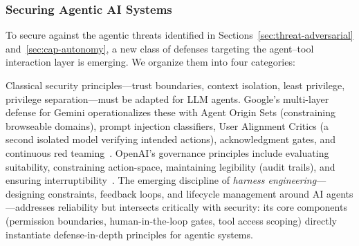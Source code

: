 \subsubsection{Securing Agentic AI Systems}
\label{sec:agentic-security}


To secure against the agentic threats identified in Sections~\ref{sec:threat-adversarial} and~\ref{sec:cap-autonomy}, a new class of defenses targeting the agent--tool interaction layer is emerging. We organize them into four categories:

\begin{description}[style=unboxed,leftmargin=0.5em,labelindent=0em,nosep]
\item[Architecture-level defenses.] Classical security principles---trust boundaries, context isolation, least privilege, privilege separation---must be adapted for LLM agents. Google's multi-layer defense for Gemini operationalizes these with Agent Origin Sets (constraining browseable domains), prompt injection classifiers, User Alignment Critics (a second isolated model verifying intended actions), acknowledgment gates, and continuous red teaming~\cite{google2025geminidefense}. OpenAI's governance principles include evaluating suitability, constraining action-space, maintaining legibility (audit trails), and ensuring interruptibility~\cite{shavit2024agenticgovernance}. The emerging discipline of \emph{harness engineering}---designing constraints, feedback loops, and lifecycle management around AI agents---addresses reliability but intersects critically with security: its core components (permission boundaries, human-in-the-loop gates, tool access scoping) directly instantiate defense-in-depth principles for agentic systems.


\end{description}
